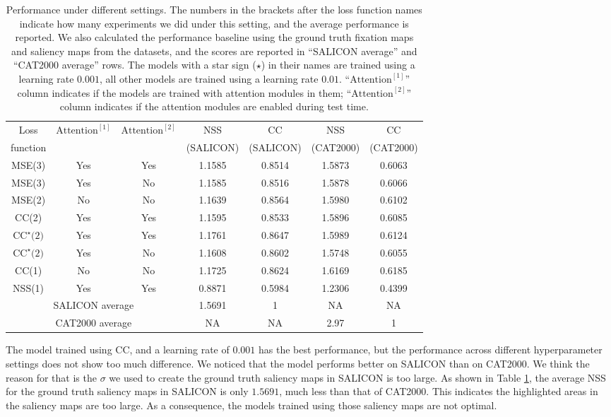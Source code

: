 \documentclass[12pt]{article}
\begin{document}
\begin{table}[h!]
    \centering
    \begin{tabular*}{\textwidth}{ccc|cccc}
        \hline
        Loss& $\text{Attention}^{[1]}$ & $\text{Attention}^{[2]}$ & NSS & CC & NSS & CC\\
        function&&&(SALICON)&(SALICON)&(CAT2000)&(CAT2000)\\
        \hline
        MSE(3) & Yes & Yes & 1.1585 & 0.8514 & 1.5873 & 0.6063\\
        MSE(3) & Yes & No & 1.1585 & 0.8516 & 1.5878 & 0.6066\\
        MSE(2) & No & No & 1.1639 & 0.8564 & 1.5980 & 0.6102\\
        CC(2) & Yes & Yes & 1.1595 & 0.8533 & 1.5896 & 0.6085\\
        $\text{CC}^{\star}\text{(2)}$& Yes & Yes & 1.1761 & 0.8647 & 1.5989 & 0.6124\\
        $\text{CC}^{\star}\text{(2)}$& Yes & No & 1.1608 & 0.8602 & 1.5748 & 0.6055\\
        CC(1) & No & No & 1.1725 & 0.8624 & 1.6169 & 0.6185\\
        NSS(1) & Yes & Yes & 0.8871 & 0.5984 & 1.2306 & 0.4399\\
        \hline
        \multicolumn{3}{c}{SALICON average} & 1.5691 & 1 & NA & NA \\
        \multicolumn{3}{c}{CAT2000 average} & NA & NA & 2.97 & 1 \\
        \hline
    \end{tabular*}
    \caption{Performance under different settings. The numbers in the brackets after the loss function names indicate
how many experiments we did under this setting, and the average performance is reported. We also calculated the performance
baseline using the ground truth fixation maps and saliency maps from the datasets, and the scores are reported in ``SALICON average''
and ``CAT2000 average'' rows. The models with a star sign ($\star$) in their names are trained using a learning rate $0.001$, all
other models are trained using a learning rate $0.01$. ``$\text{Attention}^{[1]}$'' column indicates if the models are trained with attention modules
in them; ``$\text{Attention}^{[2]}$'' column indicates if the attention modules are enabled during test time. }
    \label{tbl:performance}
\end{table}
The model trained using CC, and a learning rate of $0.001$ has the best performance, but the performance
across different hyperparameter settings does not show too much difference. We noticed that
the model performs better on SALICON than on CAT2000. We think the reason for that is the $\sigma$
we used to create the ground truth saliency maps in SALICON is too large. As shown in Table \ref{tbl:performance},
the average NSS for the ground truth saliency maps in SALICON is only $1.5691$, much less than that
of CAT2000. This indicates the highlighted areas in the saliency maps are too large. As a consequence,
the models trained using those saliency maps are not optimal.
\end{document}
